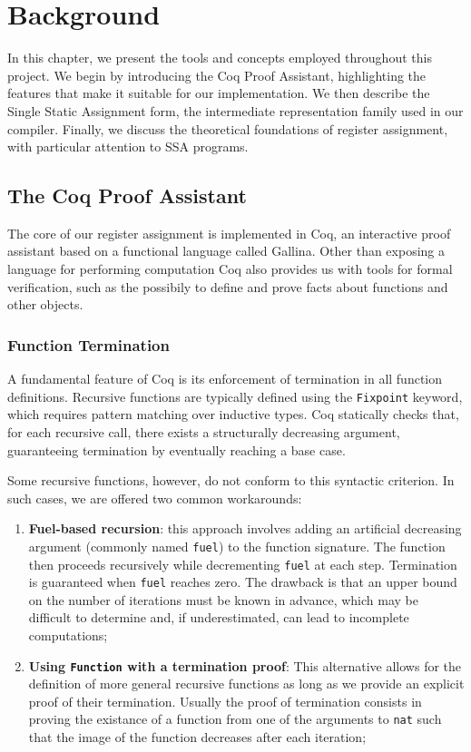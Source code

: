 
\chapter{Background}
\label{cha:background}

In this chapter, we present the tools and concepts employed throughout this project. We begin by introducing the Coq Proof Assistant, highlighting the features that make it suitable for our implementation. We then describe the Single Static Assignment form, the intermediate representation family used in our compiler. Finally, we discuss the theoretical foundations of register assignment, with particular attention to SSA programs.

\section{The Coq Proof Assistant}

The core of our register assignment is implemented in Coq, an interactive proof assistant based on a functional language called Gallina. Other than exposing a language for performing computation Coq also provides us with tools for formal verification, such as the possibily to define and prove facts about functions and other objects.

\subsection{Function Termination}
\label{subsec:funterm}

A fundamental feature of Coq is its enforcement of termination in all function definitions. Recursive functions are typically defined using the \texttt{Fixpoint} keyword, which requires pattern matching over inductive types. Coq statically checks that, for each recursive call, there exists a structurally decreasing argument, guaranteeing termination by eventually reaching a base case.

Some recursive functions, however, do not conform to this syntactic criterion. In such cases, we are offered two common workarounds:

\begin{enumerate}
    \item \textbf{Fuel-based recursion}: this approach involves adding an artificial decreasing argument (commonly named \texttt{fuel}) to the function signature. The function then proceeds recursively while decrementing \texttt{fuel} at each step. Termination is guaranteed when \texttt{fuel} reaches zero. The drawback is that an upper bound on the number of iterations must be known in advance, which may be difficult to determine and, if underestimated, can lead to incomplete computations;
    \item \textbf{Using \texttt{Function} with a termination proof}: This alternative allows for the definition of more general recursive functions as long as we provide an explicit proof of their termination. Usually the proof of termination consists in proving the existance of a function from one of the arguments to \texttt{nat} such that the image of the function decreases after each iteration;
\end{enumerate}

